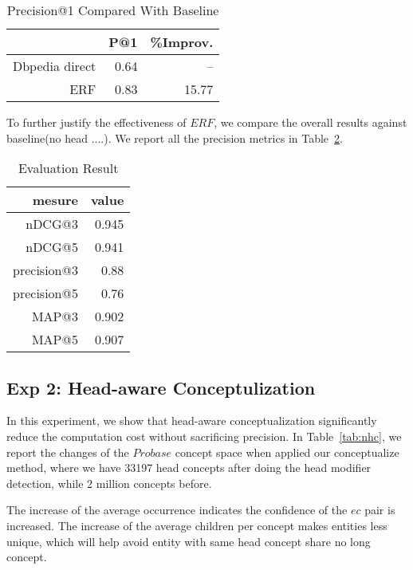\begin{table}[htbp]
  \centering
  \caption{Precision@1 Compared With Baseline}
    \begin{tabular}{rrr}
    \toprule
         & P@1  & \%Improv. \\
    \midrule
    Dbpedia direct & 0.64 & -- \\
    ERF  & 0.83 & 15.77 \\
    \bottomrule
    \end{tabular}%
  \label{tab:precision_compare}%
\end{table}%


To further justify the effectiveness of $ERF$, we compare the overall results against baseline(no head ....).
  We report all the precision metrics in Table~\ref{tab:ndcg}.

\begin{table}[htbp]
  \centering
  \caption{Evaluation Result}
    \begin{tabular}{rr}
    \toprule
    mesure & value \\
    \midrule
    nDCG@3 & 0.945 \\
    nDCG@5 & 0.941 \\
    precision@3 & 0.88 \\
    precision@5 & 0.76 \\
    MAP@3 & 0.902 \\
    MAP@5 & 0.907 \\

    \bottomrule
    \end{tabular}%
  \label{tab:ndcg}%
\end{table}%







\subsection{Exp 2: Head-aware Conceptulization}
In this experiment, we show that head-aware conceptualization significantly reduce the computation cost without sacrificing precision. 
In Table~\ref{tab:nhc}, we report the changes of the $Probase$ concept space when applied our conceptualize method, where we have 33197 head concepts after doing the head modifier detection, while 2 million concepts before.

The increase of the average occurrence indicates the confidence of the $e$\isa$c$ pair is increased.
The increase of the average children per concept makes entities less unique, which will help avoid entity with same head concept share no long concept.

